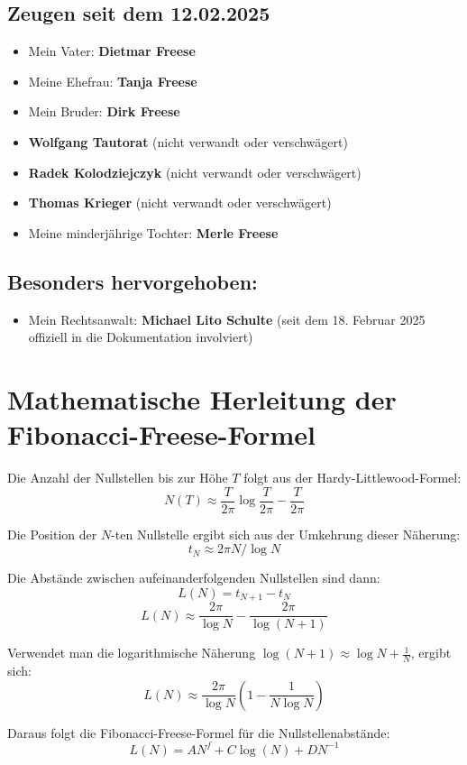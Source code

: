 \documentclass[a4paper,12pt]{article}
\begin{document}
\subsection*{Zeugen seit dem 12.02.2025}
\begin{itemize}
    \item Mein Vater: \textbf{Dietmar Freese}
    \item Meine Ehefrau: \textbf{Tanja Freese}
    \item Mein Bruder: \textbf{Dirk Freese}
    \item \textbf{Wolfgang Tautorat} (nicht verwandt oder verschwägert)
    \item \textbf{Radek Kolodziejczyk} (nicht verwandt oder verschwägert)
    \item \textbf{Thomas Krieger} (nicht verwandt oder verschwägert)
    \item Meine minderjährige Tochter: \textbf{Merle Freese}
\end{itemize}

\subsection*{Besonders hervorgehoben:}
\begin{itemize}
    \item Mein Rechtsanwalt: \textbf{Michael Lito Schulte} (seit dem 18. Februar 2025 offiziell in die Dokumentation involviert)
\end{itemize}

\section{Mathematische Herleitung der Fibonacci-Freese-Formel}
Die Anzahl der Nullstellen bis zur Höhe \( T \) folgt aus der Hardy-Littlewood-Formel:
\[
N(T) \approx \frac{T}{2\pi} \log \frac{T}{2\pi} - \frac{T}{2\pi}
\]

Die Position der \( N \)-ten Nullstelle ergibt sich aus der Umkehrung dieser Näherung:
\[
t_N \approx 2\pi N / \log N
\]

Die Abstände zwischen aufeinanderfolgenden Nullstellen sind dann:
\[
L(N) = t_{N+1} - t_N
\]
\[
L(N) \approx \frac{2\pi}{\log N} - \frac{2\pi}{\log (N+1)}
\]

Verwendet man die logarithmische Näherung \( \log (N+1) \approx \log N + \frac{1}{N} \), ergibt sich:
\[
L(N) \approx \frac{2\pi}{\log N} \left( 1 - \frac{1}{N \log N} \right)
\]

Daraus folgt die Fibonacci-Freese-Formel für die Nullstellenabstände:
\[
L(N) = A N^f + C \log(N) + D N^{-1}
\]
\end{document}
